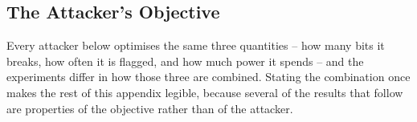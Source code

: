 %
%
%

\subsection{The Attacker's Objective}
Every attacker below optimises the same three quantities -- how many bits it breaks, how often it is
flagged, and how much power it spends -- and the experiments differ in how those three are combined.
Stating the combination once makes the rest of this appendix legible, because several of the results
that follow are properties of the objective rather than of the attacker.

